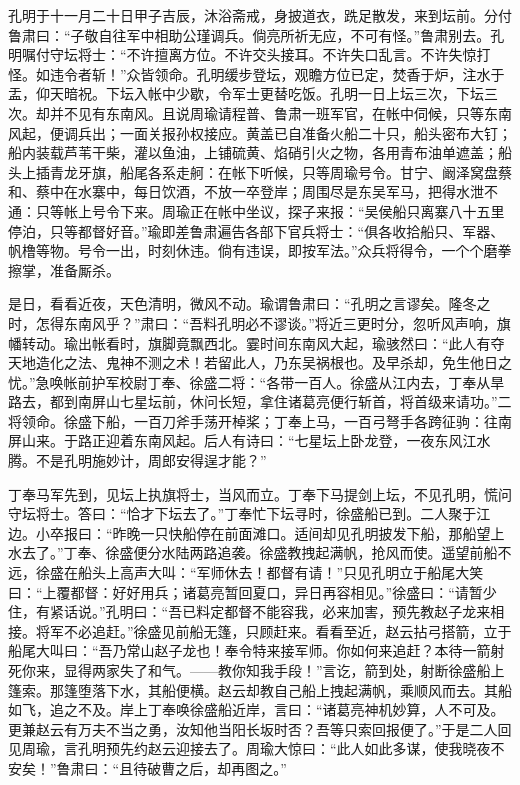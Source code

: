 孔明于十一月二十日甲子吉辰，沐浴斋戒，身披道衣，跣足散发，来到坛前。分付鲁肃曰：“子敬自往军中相助公瑾调兵。倘亮所祈无应，不可有怪。”鲁肃别去。孔明嘱付守坛将士：“不许擅离方位。不许交头接耳。不许失口乱言。不许失惊打怪。如违令者斩！”众皆领命。孔明缓步登坛，观瞻方位已定，焚香于炉，注水于盂，仰天暗祝。下坛入帐中少歇，令军士更替吃饭。孔明一日上坛三次，下坛三次。却并不见有东南风。且说周瑜请程普、鲁肃一班军官，在帐中伺候，只等东南风起，便调兵出；一面关报孙权接应。黄盖已自准备火船二十只，船头密布大钉；船内装载芦苇干柴，灌以鱼油，上铺硫黄、焰硝引火之物，各用青布油单遮盖；船头上插青龙牙旗，船尾各系走舸：在帐下听候，只等周瑜号令。甘宁、阚泽窝盘蔡和、蔡中在水寨中，每日饮酒，不放一卒登岸；周围尽是东吴军马，把得水泄不通：只等帐上号令下来。周瑜正在帐中坐议，探子来报：“吴侯船只离寨八十五里停泊，只等都督好音。”瑜即差鲁肃遍告各部下官兵将士：“俱各收拾船只、军器、帆橹等物。号令一出，时刻休违。倘有违误，即按军法。”众兵将得令，一个个磨拳擦掌，准备厮杀。

是日，看看近夜，天色清明，微风不动。瑜谓鲁肃曰：“孔明之言谬矣。隆冬之时，怎得东南风乎？”肃曰：“吾料孔明必不谬谈。”将近三更时分，忽听风声响，旗幡转动。瑜出帐看时，旗脚竟飘西北。霎时间东南风大起，瑜骇然曰：“此人有夺天地造化之法、鬼神不测之术！若留此人，乃东吴祸根也。及早杀却，免生他日之忧。”急唤帐前护军校尉丁奉、徐盛二将：“各带一百人。徐盛从江内去，丁奉从旱路去，都到南屏山七星坛前，休问长短，拿住诸葛亮便行斩首，将首级来请功。”二将领命。徐盛下船，一百刀斧手荡开棹桨；丁奉上马，一百弓弩手各跨征驹：往南屏山来。于路正迎着东南风起。后人有诗曰：“七星坛上卧龙登，一夜东风江水腾。不是孔明施妙计，周郎安得逞才能？”

丁奉马军先到，见坛上执旗将士，当风而立。丁奉下马提剑上坛，不见孔明，慌问守坛将士。答曰：“恰才下坛去了。”丁奉忙下坛寻时，徐盛船已到。二人聚于江边。小卒报曰：“昨晚一只快船停在前面滩口。适间却见孔明披发下船，那船望上水去了。”丁奉、徐盛便分水陆两路追袭。徐盛教拽起满帆，抢风而使。遥望前船不远，徐盛在船头上高声大叫：“军师休去！都督有请！”只见孔明立于船尾大笑曰：“上覆都督：好好用兵；诸葛亮暂回夏口，异日再容相见。”徐盛曰：“请暂少住，有紧话说。”孔明曰：“吾已料定都督不能容我，必来加害，预先教赵子龙来相接。将军不必追赶。”徐盛见前船无篷，只顾赶来。看看至近，赵云拈弓搭箭，立于船尾大叫曰：“吾乃常山赵子龙也！奉令特来接军师。你如何来追赶？本待一箭射死你来，显得两家失了和气。——教你知我手段！”言讫，箭到处，射断徐盛船上篷索。那篷堕落下水，其船便横。赵云却教自己船上拽起满帆，乘顺风而去。其船如飞，追之不及。岸上丁奉唤徐盛船近岸，言曰：“诸葛亮神机妙算，人不可及。更兼赵云有万夫不当之勇，汝知他当阳长坂时否？吾等只索回报便了。”于是二人回见周瑜，言孔明预先约赵云迎接去了。周瑜大惊曰：“此人如此多谋，使我晓夜不安矣！”鲁肃曰：“且待破曹之后，却再图之。”

